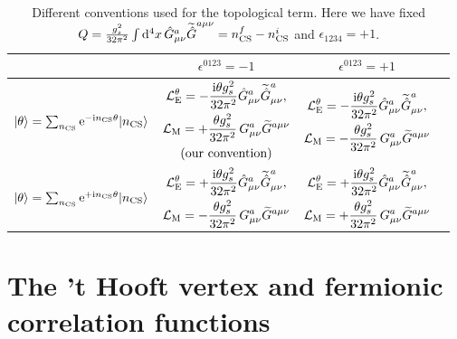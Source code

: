 \documentclass[review]{elsarticle}
\numberwithin{equation}{section}
\numberwithin{table}{section}
\numberwithin{figure}{section}
\def\d{\mathrm{d}}
\def\L{\mathcal{L}}
\def\i{\mathrm{i}}
\def\e{\mathrm{e}}
\begin{document}
\begin{table}[ht]
    \centering
    \begin{tabular}{|c||c|c|c}
        \hline
        \textit{} & $\epsilon^{0123}=-1$ & $\epsilon^{0123}=+1$
        \\
        \hline\hline
         $|\theta\rangle=\sum_{n_{\rm CS}}  \e^{-\i n_{\rm CS}\theta} |n_{\rm CS}\rangle$ &  $\begin{gathered}
            \L^\theta_{\rm E}=-\frac{\i\theta g_s^2}{32\pi^2}\hat{G}^a_{\mu\nu}\widetilde{\hat{G}}^a_{\mu\nu}, \\ \L_{\rm M}= +\frac{\theta g_s^2}{32\pi^2}\, G^a_{\mu\nu}\widetilde{G}^{a\mu\nu}\\ \text{(our convention)}
         \end{gathered}$ & $\begin{gathered}
        \L^\theta_{\rm E}=-\frac{\i\theta g_s^2}{32\pi^2}\hat{G}^a_{\mu\nu}\widetilde{\hat{G}}^a_{\mu\nu}, \\ \L_{\rm M}= -\frac{\theta g_s^2}{32\pi^2}\, G^a_{\mu\nu}\widetilde{G}^{a\mu\nu} 
         \end{gathered}$ \\
         \hline
         $|\theta\rangle=\sum_{n_{\rm CS}} \e^{+\i n_{\rm CS}\theta} |n_{\rm CS}\rangle$  & $\begin{gathered}
            \L^\theta_{\rm E}=+\frac{\i\theta g_s^2}{32\pi^2}\hat{G}^a_{\mu\nu}\widetilde{\hat{G}}^a_{\mu\nu}, \\ \L_{\rm M}= -\frac{\theta g_s^2}{32\pi^2}\, G^a_{\mu\nu}\widetilde{G}^{a\mu\nu}
         \end{gathered}$ & $\begin{gathered}
            \L^\theta_{\rm E}=+\frac{\i\theta g_s^2}{32\pi^2}\hat{G}^a_{\mu\nu}\widetilde{\hat{G}}^a_{\mu\nu}, \\ \L_{\rm M}= +\frac{\theta g_s^2}{32\pi^2}\, G^a_{\mu\nu}\widetilde{G}^{a\mu\nu}
         \end{gathered}$ \\
         \hline
    \end{tabular}
    \caption{Different conventions used for the topological term. Here we have fixed $Q=\frac{g_s^2}{32\pi^2} \int\d^4 x\, 
\hat{G}^a_{\mu\nu}
\widetilde{\hat{G}}^{a\mu\nu} = n^f_{\rm CS}-n^i_{\rm CS} $ and $\epsilon_{1234}=+1$.}
\label{tab:different_conventions}
\end{table}



\section{The 't Hooft vertex and fermionic correlation functions}
\end{document}
